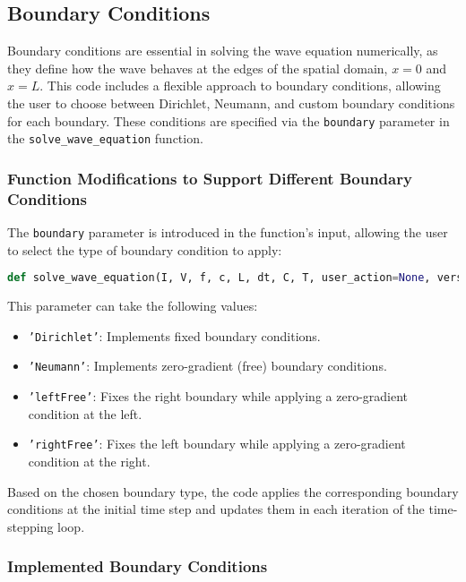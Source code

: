 \documentclass{article}
\begin{document}
		
		\subsection{Boundary Conditions}
		
		Boundary conditions are essential in solving the wave equation numerically, as they define how the wave behaves at the edges of the spatial domain, \( x = 0 \) and \( x = L \). This code includes a flexible approach to boundary conditions, allowing the user to choose between Dirichlet, Neumann, and custom boundary conditions for each boundary. These conditions are specified via the \texttt{boundary} parameter in the \texttt{solve\_wave\_equation} function.
		
		\subsubsection{Function Modifications to Support Different Boundary Conditions}
		
		The \texttt{boundary} parameter is introduced in the function’s input, allowing the user to select the type of boundary condition to apply:
		\begin{lstlisting}[language=Python, caption=Function Signature with Boundary Condition Parameter]
			def solve_wave_equation(I, V, f, c, L, dt, C, T, user_action=None, version='scalar', save_dir=None, boundary='Dirichlet'):
		\end{lstlisting}
		
		This parameter can take the following values:
		\begin{itemize}
			\item \texttt{'Dirichlet'}: Implements fixed boundary conditions.
			\item \texttt{'Neumann'}: Implements zero-gradient (free) boundary conditions.
			\item \texttt{'leftFree'}: Fixes the right boundary while applying a zero-gradient condition at the left.
			\item \texttt{'rightFree'}: Fixes the left boundary while applying a zero-gradient condition at the right.
		\end{itemize}
		
		Based on the chosen boundary type, the code applies the corresponding boundary conditions at the initial time step and updates them in each iteration of the time-stepping loop.
		
		\subsubsection{Implemented Boundary Conditions}
		
\end{document}
